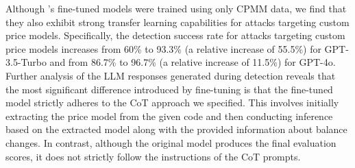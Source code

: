 Although \name's fine-tuned models were trained using only CPMM data, we find that they also exhibit strong transfer learning capabilities for attacks targeting custom price models.
Specifically, the detection success rate for attacks targeting custom price models increases from 60\% to 93.3\% (a relative increase of 55.5\%) for GPT-3.5-Turbo and from 86.7\% to 96.7\% (a relative increase of 11.5\%) for GPT-4o. 
Further analysis of the LLM responses generated during detection reveals that the most significant difference introduced by fine-tuning is that the fine-tuned model strictly adheres to the CoT approach we specified.
This involves initially extracting the price model from the given code and then conducting inference based on the extracted model along with the provided information about balance changes.
In contrast, although the original model produces the final evaluation scores, it does not strictly follow the instructions of the CoT prompts.




\begin{table}[t!]
    \centering
    \caption{Comparison between GPT-3.5-Turbo and GPT-4o.}
    \vspace{-2ex}
    \small
    \label{tab:compare_between_models}
\end{table}

